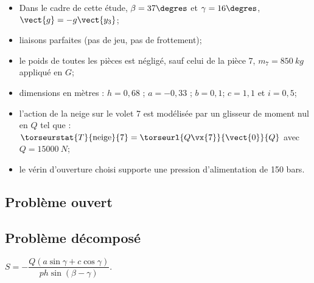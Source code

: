 \begin{itemize}
\item Dans le cadre de cette étude, $\beta = 37\degres$ et $\gamma = 16\degres$, $\vect{g}=-g\vect{y_3}$;
\item liaisons parfaites (pas de jeu, pas de frottement);
\item le poids de toutes les pièces est négligé, sauf celui de la pièce 7, $m_7=\SI{850}{kg}$ appliqué en $G$;
\item dimensions en mètres :  $h=0,68$ ; $a=-0,33$ ; $b=0,1$; $c=1,1$ et $i=0,5$;
\item l’action de la neige sur le volet 7 est modélisée par un glisseur de moment nul en $Q$ tel que :
$\torseurstat{T}{\text{neige}}{7} =  \torseurl{Q\vx{7}}{\vect{0}}{Q}$ avec $Q = \SI{15000}{N}$;
\item le vérin d’ouverture choisi supporte une pression d'alimentation de 150 bars.
\end{itemize}

\fi
\subsection*{Problème ouvert}


\subsection*{Problème décomposé}







\ifprof
\else
\begin{marginfigure}
\begin{solution}
$S= - \dfrac{Q\left( a\sin \gamma+c\cos\gamma \right)  }{p h \sin\left(\beta - \gamma\right)}$.
\end{solution}
\end{marginfigure}
\fi


